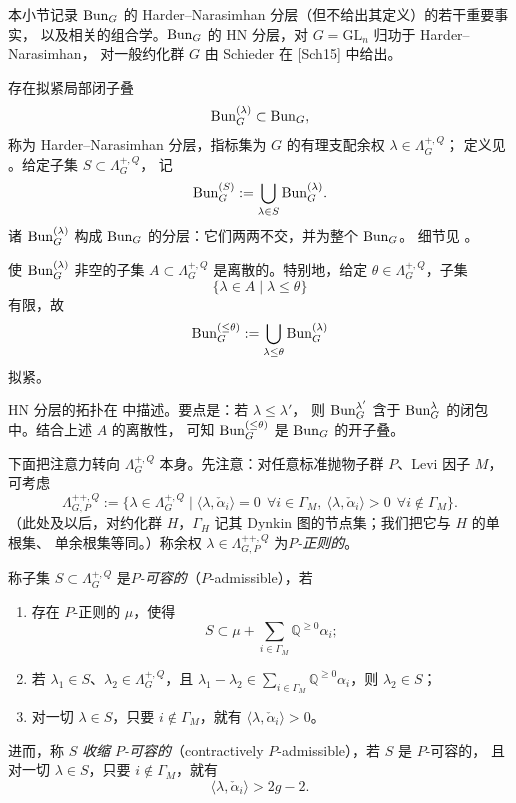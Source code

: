 本小节记录 $\mathrm{Bun}_G$ 的 Harder–Narasimhan 分层（但不给出其定义）的若干重要事实，
以及相关的组合学。$\mathrm{Bun}_G$ 的 HN 分层，对 $G=\mathrm{GL}_n$ 归功于 Harder–Narasimhan，
对一般约化群 $G$ 由 Schieder 在 [Sch15] 中给出。

存在拟紧局部闭子叠
\[
\mathrm{Bun}^{(\lambda)}_G\subset \mathrm{Bun}_G,
\]
称为 Harder–Narasimhan 分层，指标集为 $G$ 的有理支配余权 $\lambda\in \Lambda^{+,Q}_G$；
定义见 \cite[定理 7.4.3]{DG15}。给定子集 $S\subset \Lambda^{+,Q}_G$，
记
\[
\mathrm{Bun}^{(S)}_G:=\bigcup_{\lambda\in S}\mathrm{Bun}^{(\lambda)}_G .
\]
诸 $\mathrm{Bun}^{(\lambda)}_G$ 构成 $\mathrm{Bun}_G$ 的分层：它们两两不交，并为整个 $\mathrm{Bun}_G$。
细节见 \cite[定理 7.4.3]{DG15}。

使 $\mathrm{Bun}^{(\lambda)}_G$ 非空的子集 $A\subset \Lambda^{+,Q}_G$ 是离散的。特别地，给定
$\theta\in \Lambda^{+,Q}_G$，子集
\[
\{\lambda\in A\mid \lambda\le \theta\}
\]
有限，故
\[
\mathrm{Bun}^{(\le\theta)}_G:=\bigcup_{\lambda\le \theta}\mathrm{Bun}^{(\lambda)}_G
\]
拟紧。

HN 分层的拓扑在 \cite[推论 7.4.11]{DG15} 中描述。要点是：若 $\lambda\le \lambda'$，
则 $\mathrm{Bun}^{\lambda'}_G$ 含于 $\mathrm{Bun}^{\lambda}_G$ 的闭包中。结合上述 $A$ 的离散性，
可知 $\mathrm{Bun}^{(\le\theta)}_G$ 是 $\mathrm{Bun}_G$ 的开子叠。

下面把注意力转向 $\Lambda^{+,Q}_G$ 本身。先注意：对任意标准抛物子群 $P$、Levi 因子 $M$，
可考虑
\[
\Lambda^{++,Q}_{G,P}:=\{\lambda\in \Lambda^{+,Q}_G\mid
\langle\lambda,\check\alpha_i\rangle=0\ \ \forall i\in \Gamma_M,\
\langle\lambda,\check\alpha_i\rangle>0\ \ \forall i\notin \Gamma_M\}.
\]
（此处及以后，对约化群 $H$，$\Gamma_H$ 记其 Dynkin 图的节点集；我们把它与 $H$ 的单根集、
单余根集等同。）称余权 $\lambda\in \Lambda^{++,Q}_{G,P}$ 为\emph{$P$-正则的}。

\begin{definition}[{[DG15, 定义 8.2.2]}]
\label{def:padmissible}
称子集 $S\subset \Lambda^{+,Q}_G$ 是\emph{$P$-可容的}（$P$-admissible），若
\begin{enumerate}
\item[(1)] 存在 $P$-正则的 $\mu$，使得
\[
S\subset \mu+\sum_{i\in \Gamma_M}\mathbb{Q}^{\ge 0}\alpha_i;
\]
\item[(2)] 若 $\lambda_1\in S$、$\lambda_2\in \Lambda^{+,Q}_G$，且
$\lambda_1-\lambda_2\in \sum_{i\in \Gamma_M}\mathbb{Q}^{\ge 0}\alpha_i$，则 $\lambda_2\in S$；
\item[(3)] 对一切 $\lambda\in S$，只要 $i\notin \Gamma_M$，就有
$\langle\lambda,\check\alpha_i\rangle>0$。
\end{enumerate}
进而，称 $S$ \emph{收缩 $P$-可容的}（contractively $P$-admissible），若 $S$ 是 $P$-可容的，
且对一切 $\lambda\in S$，只要 $i\notin \Gamma_M$，就有
\[
\langle\lambda,\check\alpha_i\rangle>2g-2.
\]
\end{definition}

